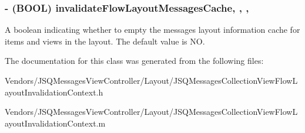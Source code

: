 \subsubsection[{invalidate\+Flow\+Layout\+Messages\+Cache}]{\setlength{\rightskip}{0pt plus 5cm}-\/ (B\+O\+O\+L) invalidate\+Flow\+Layout\+Messages\+Cache\hspace{0.3cm}{\ttfamily [read]}, {\ttfamily [write]}, {\ttfamily [nonatomic]}, {\ttfamily [assign]}}\label{interface_j_s_q_messages_collection_view_flow_layout_invalidation_context_aa696f200fad5e62ff83ca423b369a20f}
A boolean indicating whether to empty the messages layout information cache for items and views in the layout. The default value is {\ttfamily N\+O}. 

The documentation for this class was generated from the following files\+:\begin{DoxyCompactItemize}
\item 
Vendors/\+J\+S\+Q\+Messages\+View\+Controller/\+Layout/J\+S\+Q\+Messages\+Collection\+View\+Flow\+Layout\+Invalidation\+Context.\+h\item 
Vendors/\+J\+S\+Q\+Messages\+View\+Controller/\+Layout/J\+S\+Q\+Messages\+Collection\+View\+Flow\+Layout\+Invalidation\+Context.\+m\end{DoxyCompactItemize}
